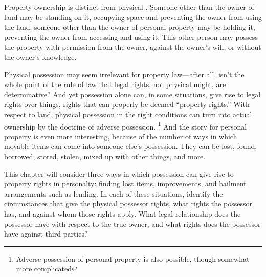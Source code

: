Property ownership is distinct from physical . Someone other
than the owner of land may be standing on it, occupying space and preventing
the owner from using the land; someone other than the owner of personal property
may be holding it, preventing the owner from accessing and using it. This other
person may possess the property with permission from the owner, against the
owner's will, or without the owner's knowledge.

Physical possession may seem irrelevant for property law---after all, isn't the
whole point of the rule of law that legal rights, not physical might, are
determinative? And yet possession alone can, in some situations, give rise to
legal rights over things, rights that can properly be deemed ``property
rights.'' With respect to land,  physical possession in the right conditions can
turn into actual ownership by the doctrine of adverse possession.
\unskip\footnote{Adverse possession of personal property is also possible,
though somewhat more complicated}
And the story
for personal property is even more interesting, because of the number of ways in
which movable items can come into someone else's possession. They can be lost,
found, borrowed, stored, stolen, mixed up with other things, and more.

This chapter will consider three ways in which possession can give rise to
property rights in personalty: finding lost items, improvements, and bailment
arrangements such as lending. In each of these situations, identify the
circumstances that give the physical possessor rights, what rights the possessor
has, and against whom those rights apply. What legal relationship does the
possessor have with respect to the true owner, and what rights does the
possessor have against third parties?

